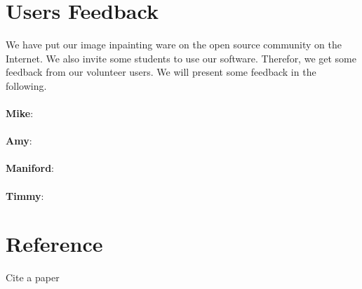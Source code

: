 \documentclass[12pt]{article}
\begin{document}
\section{Users Feedback}
\qquad We have put our image inpainting ware on the open source community on the Internet. We also invite some students to use our software. Therefor, we get some feedback from our volunteer users. We will present some feedback in the following. \\ \ \\
\textbf{Mike}: \\ \\
\textbf{Amy}: \\ \\
\textbf{Maniford}: \\ \\
\textbf{Timmy}: 


\section{Reference}









\newpage
Cite a paper\cite{DBLP:conf/siggraph/BertalmioSCB00}


\end{document}
